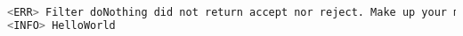 \begin{lstlisting}[language=bash, caption={Filter printing message}]
<ERR> Filter doNothing did not return accept nor reject. Make up your mind
<INFO> HelloWorld
\end{lstlisting}